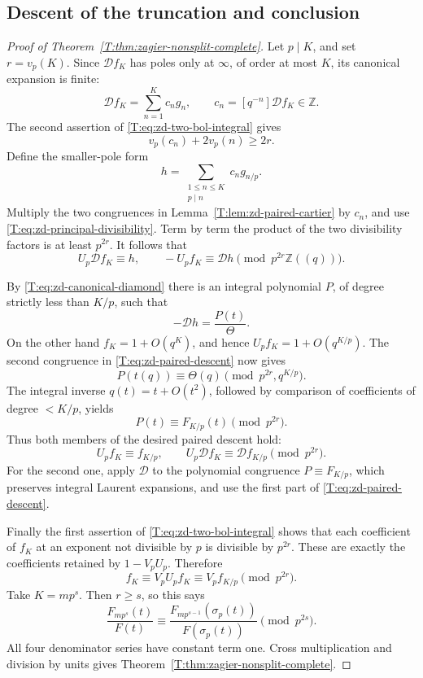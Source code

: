\documentclass[11pt,a4paper]{article}
\theoremstyle{definition}\newtheorem{definition}[theorem]{Definition}
\theoremstyle{remark}\newtheorem{remark}[theorem]{Remark}
\numberwithin{equation}{section}
\begin{document}
\subsection{Descent of the truncation and conclusion}

\begin{proof}[Proof of Theorem~\ref{T:thm:zagier-nonsplit-complete}]
Let \(p\mid K\), and set \(r=v_p(K)\).
Since \(\mathcal{D}f_K\) has poles only at \(\infty\), of order
at most \(K\), its canonical expansion is finite:
\[
 \mathcal{D}f_K=\sum_{n=1}^{K}c_ng_n,\qquad
 c_n=[q^{-n}]\mathcal{D}f_K\in\mathbb Z.
\]
The second assertion of \eqref{T:eq:zd-two-bol-integral} gives
\begin{equation}\label{T:eq:zd-principal-divisibility}
 v_p(c_n)+2v_p(n)\ge2r.
\end{equation}
Define the smaller-pole form
\[
 h=\sum_{\substack{1\le n\le K\\p\mid n}}c_ng_{n/p}.
\]
Multiply the two congruences in
Lemma~\ref{T:lem:zd-paired-cartier} by \(c_n\), and use
\eqref{T:eq:zd-principal-divisibility}.  Term by term the
product of the two divisibility factors is at least \(p^{2r}\).
It follows that
\begin{equation}\label{T:eq:zd-paired-descent}
 U_p\mathcal{D}f_K\equiv h,\qquad
 -U_pf_K\equiv\mathcal{D}h
 \pmod{p^{2r}\mathbb Z((q))}.
\end{equation}

By \eqref{T:eq:zd-canonical-diamond} there is an integral polynomial
\(P\), of degree strictly less than \(K/p\), such that
\[
 -\mathcal{D}h=\frac{P(t)}{\Theta}.
\]
On the other hand \(f_K=1+O(q^K)\), and hence
\(U_pf_K=1+O(q^{K/p})\).
The second congruence in \eqref{T:eq:zd-paired-descent} now gives
\[
 P(t(q))\equiv\Theta(q)\pmod{p^{2r},q^{K/p}}.
\]
The integral inverse \(q(t)=t+O(t^2)\), followed by comparison
of coefficients of degree \(<K/p\), yields
\[
 P(t)\equiv F_{K/p}(t)\pmod{p^{2r}}.
\]
Thus both members of the desired paired descent hold:
\begin{equation}\label{T:eq:zd-final-cartier}
 U_pf_K\equiv f_{K/p},\qquad
 U_p\mathcal{D}f_K\equiv\mathcal{D}f_{K/p}
 \pmod{p^{2r}}.
\end{equation}
For the second one, apply \(\mathcal{D}\) to the polynomial
congruence \(P\equiv F_{K/p}\), which preserves integral
Laurent expansions, and use the first part of
\eqref{T:eq:zd-paired-descent}.

Finally the first assertion of \eqref{T:eq:zd-two-bol-integral}
shows that each coefficient of \(f_K\) at an exponent not
divisible by \(p\) is divisible by \(p^{2r}\).
These are exactly the coefficients retained by \(1-V_pU_p\).
Therefore
\[
 f_K\equiv V_pU_pf_K\equiv V_pf_{K/p}\pmod{p^{2r}}.
\]
Take \(K=mp^s\).  Then \(r\ge s\), so this says
\[
 \frac{F_{mp^s}(t)}{F(t)}
 \equiv
 \frac{F_{mp^{s-1}}(\sigma_p(t))}{F(\sigma_p(t))}
 \pmod{p^{2s}}.
\]
All four denominator series have constant term one.
Cross multiplication and division by units gives
Theorem~\ref{T:thm:zagier-nonsplit-complete}.
\end{proof}
\end{document}
